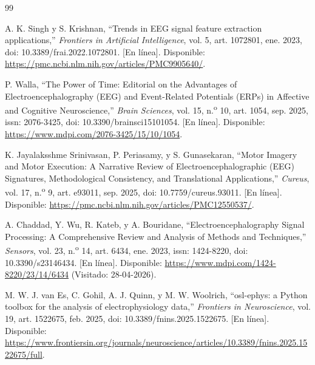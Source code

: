 \documentclass[12pt,letterpaper,oneside]{article}
\begin{document}
\begingroup
\renewcommand{\section}[2]{}
\begin{thebibliography}{99}

A. K. Singh y S. Krishnan, ``Trends in EEG signal feature extraction applications,'' \textit{Frontiers in Artificial Intelligence}, vol. 5, art. 1072801, ene. 2023, doi: 10.3389/frai.2022.1072801. [En línea]. Disponible: \url{https://pmc.ncbi.nlm.nih.gov/articles/PMC9905640/}.

P. Walla, ``The Power of Time: Editorial on the Advantages of Electroencephalography (EEG) and Event-Related Potentials (ERPs) in Affective and Cognitive Neuroscience,'' \textit{Brain Sciences}, vol. 15, n.\textsuperscript{o} 10, art. 1054, sep. 2025, issn: 2076-3425, doi: 10.3390/brainsci15101054. [En línea]. Disponible: \url{https://www.mdpi.com/2076-3425/15/10/1054}.

K. Jayalaksshme Srinivasan, P. Periasamy, y S. Gunasekaran, ``Motor Imagery and Motor Execution: A Narrative Review of Electroencephalographic (EEG) Signatures, Methodological Consistency, and Translational Applications,'' \textit{Cureus}, vol. 17, n.\textsuperscript{o} 9, art. e93011, sep. 2025, doi: 10.7759/cureus.93011. [En línea]. Disponible: \url{https://pmc.ncbi.nlm.nih.gov/articles/PMC12550537/}.

A. Chaddad, Y. Wu, R. Kateb, y A. Bouridane, ``Electroencephalography Signal Processing: A Comprehensive Review and Analysis of Methods and Techniques,'' \textit{Sensors}, vol. 23, n.\textsuperscript{o} 14, art. 6434, ene. 2023, issn: 1424-8220, doi: 10.3390/s23146434. [En línea]. Disponible: \url{https://www.mdpi.com/1424-8220/23/14/6434} (Visitado: 28-04-2026).

M. W. J. van Es, C. Gohil, A. J. Quinn, y M. W. Woolrich, ``osl-ephys: a Python toolbox for the analysis of electrophysiology data,'' \textit{Frontiers in Neuroscience}, vol. 19, art. 1522675, feb. 2025, doi: 10.3389/fnins.2025.1522675. [En línea]. Disponible: \url{https://www.frontiersin.org/journals/neuroscience/articles/10.3389/fnins.2025.1522675/full}.


\end{thebibliography}
\end{document}

